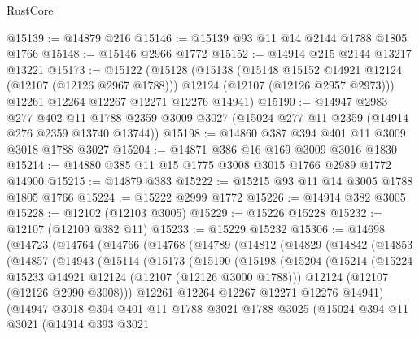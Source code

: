 \begin{lexlean}{RustCore}
\begin{coremodule}
@15139 := @14879 @216
@15146 := @15139 @93 @11 @14 @2144 @1788 @1805 @1766
@15148 := @15146 @2966 @1772
@15152 := @14914 @215 @2144 @13217 @13221
@15173 := @15122
    (@15128
      (@15138
        (@15148 @15152 @14921 @12124 (@12107 (@12126 @2967 @1788)))
        @12124
        (@12107 (@12126 @2957 @2973)))
      @12261
      @12264
      @12267
      @12271
      @12276
      @14941)
@15190 := @14947
    @2983
    @277
    @402
    @11
    @1788
    @2359
    @3009
    @3027
    (@15024 @277 @11 @2359 (@14914 @276 @2359 @13740 @13744))
@15198 := @14860 @387 @394 @401 @11 @3009 @3018 @1788 @3027
@15204 := @14871 @386 @16 @169 @3009 @3016 @1830
@15214 := @14880 @385 @11 @15 @1775 @3008 @3015 @1766 @2989 @1772 @14900
@15215 := @14879 @383
@15222 := @15215 @93 @11 @14 @3005 @1788 @1805 @1766
@15224 := @15222 @2999 @1772
@15226 := @14914 @382 @3005
@15228 := @12102 (@12103 @3005)
@15229 := @15226 @15228
@15232 := @12107 (@12109 @382 @11)
@15233 := @15229 @15232
@15306 := @14698
    (@14723
      (@14764
        (@14766
          (@14768
            (@14789
              (@14812
                (@14829
                  (@14842
                    (@14853
                      (@14857
                        (@14943
                          (@15114
                            (@15173
                              (@15190
                                (@15198
                                  (@15204
                                    (@15214
                                      (@15224 @15233 @14921 @12124 (@12107 (@12126 @3000 @1788)))
                                      @12124
                                      (@12107 (@12126 @2990 @3008)))
                                    @12261
                                    @12264
                                    @12267
                                    @12271
                                    @12276
                                    @14941)
                                  (@14947
                                    @3018
                                    @394
                                    @401
                                    @11
                                    @1788
                                    @3021
                                    @1788
                                    @3025
                                    (@15024
                                      @394
                                      @11
                                      @3021
                                      (@14914
                                        @393
                                        @3021

\end{coremodule}
\end{lexlean}
